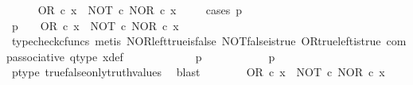 \begin{isabellebody}
\ \ \ \ \isamarkupfalse%
\ {\isachardoublequoteopen}OR\ {\isasymcirc}\isactrlsub c\ x\ {\isacharequal}{\kern0pt}\ {\isacharparenleft}{\kern0pt}NOT\ {\isasymcirc}\isactrlsub c\ NOR{\isacharparenright}{\kern0pt}\ {\isasymcirc}\isactrlsub c\ x{\isachardoublequoteclose}\isanewline
\ \ \ \ \isamarkupfalse%
{\isacharparenleft}{\kern0pt}cases\ {\isachardoublequoteopen}p\ {\isacharequal}{\kern0pt}\ {\isasymt}{\isachardoublequoteclose}{\isacharparenright}{\kern0pt}\isanewline
\ \ \ \ \ \ \isamarkupfalse%
\ {\isachardoublequoteopen}p\ {\isacharequal}{\kern0pt}\ {\isasymt}\ {\isasymLongrightarrow}\ OR\ {\isasymcirc}\isactrlsub c\ x\ {\isacharequal}{\kern0pt}\ {\isacharparenleft}{\kern0pt}NOT\ {\isasymcirc}\isactrlsub c\ NOR{\isacharparenright}{\kern0pt}\ {\isasymcirc}\isactrlsub c\ x{\isachardoublequoteclose}\isanewline
\ \ \ \ \ \ \ \ \isamarkupfalse%
\ {\isacharparenleft}{\kern0pt}typecheck{\isacharunderscore}{\kern0pt}cfuncs{\isacharcomma}{\kern0pt}\ metis\ NOR{\isacharunderscore}{\kern0pt}left{\isacharunderscore}{\kern0pt}true{\isacharunderscore}{\kern0pt}is{\isacharunderscore}{\kern0pt}false\ NOT{\isacharunderscore}{\kern0pt}false{\isacharunderscore}{\kern0pt}is{\isacharunderscore}{\kern0pt}true\ OR{\isacharunderscore}{\kern0pt}true{\isacharunderscore}{\kern0pt}left{\isacharunderscore}{\kern0pt}is{\isacharunderscore}{\kern0pt}true\ comp{\isacharunderscore}{\kern0pt}associative{}\ q{\isacharunderscore}{\kern0pt}type\ x{\isacharunderscore}{\kern0pt}def{\isacharparenright}{\kern0pt}\isanewline
\ \ \ \ \isamarkupfalse%
\isanewline
\ \ \ \ \ \ \isamarkupfalse%
\ {\isachardoublequoteopen}p\ {\isasymnoteq}\ {\isasymt}{\isachardoublequoteclose}\isanewline
\ \ \ \ \ \ \isamarkupfalse%
\ \isamarkupfalse%
\ {\isachardoublequoteopen}p\ {\isacharequal}{\kern0pt}\ {\isasymf}{\isachardoublequoteclose}\isanewline
\ \ \ \ \ \ \ \ \isamarkupfalse%
\ p{\isacharunderscore}{\kern0pt}type\ true{\isacharunderscore}{\kern0pt}false{\isacharunderscore}{\kern0pt}only{\isacharunderscore}{\kern0pt}truth{\isacharunderscore}{\kern0pt}values\ \isamarkupfalse%
\ blast\isanewline
\ \ \ \ \ \ \isamarkupfalse%
\ {\isachardoublequoteopen}OR\ {\isasymcirc}\isactrlsub c\ x\ {\isacharequal}{\kern0pt}\ {\isacharparenleft}{\kern0pt}NOT\ {\isasymcirc}\isactrlsub c\ NOR{\isacharparenright}{\kern0pt}\ {\isasymcirc}\isactrlsub c\ x{\isachardoublequoteclose}\isanewline
\ \ \ \ \ \ \isamarkupfalse%

\end{isabellebody}
